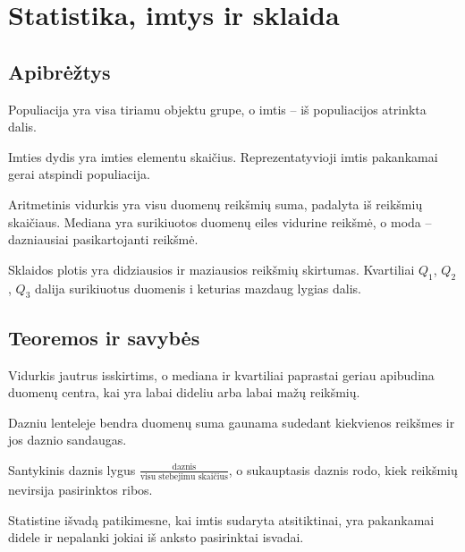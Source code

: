 \section{Statistika, imtys ir sklaida}\label{sec:statistika-imtys-ir-sklaida}

\subsection{Apibrėžtys}
\begin{apibreztis}
Populiacija yra visa tiriamu objektu grupe, o imtis -- iš populiacijos atrinkta dalis.
\end{apibreztis}
\begin{apibreztis}
Imties dydis yra imties elementu skaičius. Reprezentatyvioji imtis pakankamai gerai atspindi populiacija.
\end{apibreztis}
\begin{apibreztis}
Aritmetinis vidurkis yra visu duomenų reikšmių suma, padalyta iš reikšmių skaičiaus. Mediana yra surikiuotos duomenų eiles vidurine reikšmė, o moda -- dazniausiai pasikartojanti reikšmė.
\end{apibreztis}
\begin{apibreztis}
Sklaidos plotis yra didziausios ir maziausios reikšmių skirtumas. Kvartiliai $Q_1$, $Q_2$, $Q_3$ dalija surikiuotus duomenis i keturias mazdaug lygias dalis.
\end{apibreztis}

\subsection{Teoremos ir savybės}
\begin{savybe}
Vidurkis jautrus isskirtims, o mediana ir kvartiliai paprastai geriau apibudina duomenų centra, kai yra labai dideliu arba labai mažų reikšmių.
\end{savybe}
\begin{savybe}
Dazniu lenteleje bendra duomenų suma gaunama sudedant kiekvienos reikšmes ir jos daznio sandaugas.
\end{savybe}
\begin{savybe}
Santykinis daznis lygus $\frac{\text{daznis}}{\text{visu stebejimu skaičius}}$, o sukauptasis daznis rodo, kiek reikšmių nevirsija pasirinktos ribos.
\end{savybe}
\begin{pastaba}
Statistine išvadą patikimesne, kai imtis sudaryta atsitiktinai, yra pakankamai didele ir nepalanki jokiai iš anksto pasirinktai isvadai.
\end{pastaba}

